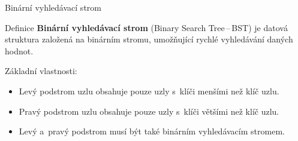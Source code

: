 \documentclass[10pt]{beamer}
\begin{document}
\begin{frame}[t]{Binární vyhledávací strom}
    \smallskip
    \begin{block}{Definice}
    \medskip
    \textbf{Binární vyhledávací strom} (Binary Search Tree\,--\,BST) je datová struktura založená na binárním stromu, umožňující rychlé vyhledávání daných hodnot.
    \end{block}
    \medskip
    Základní vlastnosti:
    \begin{itemize}
        \item Levý podstrom uzlu obsahuje pouze uzly s~klíči menšími než klíč uzlu.
        \item Pravý podstrom uzlu obsahuje pouze uzly s~klíči většími než klíč uzlu.
        \item Levý a~pravý podstrom musí být také binárním vyhledávacím stromem.
    \end{itemize}
\end{frame}
\end{document}
